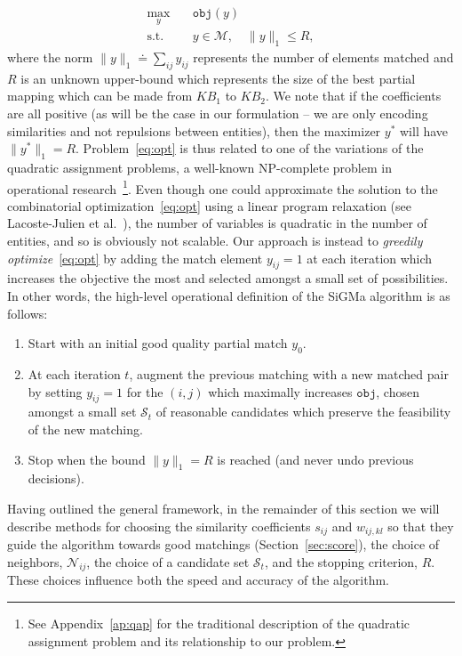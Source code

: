 \documentclass{sig-alternate}
\newcommand{\KB}{K\!B}
\begin{document}
%
%
%
%
\begin{equation} \label{eq:opt}
\begin{aligned}
\max_y &\quad \texttt{obj}(y) \\
\textrm{s.t.} &\quad y \in \mathcal{M}, \quad \lVert y \rVert_1 \leq R,
\end{aligned}
\end{equation}
where the norm $\lVert y \rVert_1 \doteq \sum_{ij} y_{ij}$ represents the number of elements matched
%
and $R$ is an unknown upper-bound which represents the size of the best partial mapping which can be made from $\KB_1$ to $\KB_2$. We note that if the coefficients are all positive (as will be the case in our formulation -- we are only encoding similarities and not repulsions between entities), then the maximizer $y^*$ will have $\lVert y^* \rVert_1 = R$. Problem~\eqref{eq:opt} is thus related to one of the variations of the quadratic assignment problems, a well-known NP-complete problem in operational research~\cite{lawler63qap}\footnote{See Appendix~\ref{ap:qap} for the traditional description of the quadratic assignment problem and its relationship to our problem.}.
Even though one could approximate the solution to the combinatorial optimization~\eqref{eq:opt} using a linear program relaxation (see Lacoste-Julien et al.~\cite{lacoste06qap}), the number of variables is quadratic in the number of entities, and so is obviously not scalable. Our approach is instead to \emph{greedily optimize}~\eqref{eq:opt} by adding the match element $y_{ij}=1$ at each iteration which increases the objective the most and selected amongst a small set of possibilities. In other words, the high-level operational definition of the \textsf{SiGMa} algorithm is as follows:
\begin{enumerate}
    \item Start with an initial good quality partial match $y_0$.
    \item At each iteration $t$, augment the previous matching with a new matched pair by setting $y_{ij}=1$ for the $(i,j)$ which maximally increases $\texttt{obj}$, chosen amongst a small set $\mathcal{S}_t$ of reasonable candidates which preserve the feasibility of the new matching.
    \item Stop when the bound $\lVert y \rVert_1 = R$ is reached (and never undo previous decisions).
\end{enumerate}

Having outlined the general framework, in the remainder of this section we will describe methods for choosing the similarity coefficients $s_{ij}$ and $w_{ij,kl}$ so that they guide the algorithm towards good matchings (Section~\ref{sec:score}), the choice of neighbors, $\mathcal{N}_{ij}$, the choice of a candidate set $\mathcal{S}_t$, and the stopping criterion, $R$. These choices influence both the speed and accuracy of the algorithm.
\end{document}
